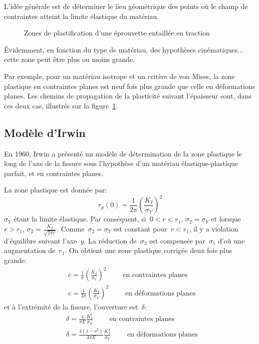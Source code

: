 L'idée générale est de déterminer le lieu géométrique des points où le champ de contraintes atteint la limite élastique du matériau.
\begin{figure}[ht]\centering
{}\hspace{9em}
\caption{Zones de plastification d'une éprouvette entaillée en traction}\label{fig:propagation}
\end{figure}
Évidemment, en fonction du type de matériau, des hypothèses cinématiques... cette zone peut être plus ou moins grande.

\medskip
Par exemple, pour un matériau isotrope et un critère de von Mises, la zone plastique en contraintes planes est neuf fois plus grande que celle en déformations planes.
\medskipvm
Les chemins de propagation de la plasticité suivant l'épaisseur sont, dans ces deux cas, illustrés sur la figure~\ref{fig:propagation}.


\medskip
\subsection{Modèle d'Irwin}
En 1960, Irwin a présenté un modèle de détermination de la zone plastique le long de l'axe de la fissure sous l'hypothèse d'un matériau élastique-plastique parfait, et en contraintes planes.

La zone plastique est donnée par:
\begin{equation}r_p(0)=\frac1{2\pi}\left(\frac{K_I}{\sigma_Y}\right)^2
\end{equation}$\sigma_Y$ étant la limite élastique.
Par conséquent, si~$0<r<r_1$, $\sigma_2=\sigma_Y$ et lorsque~$r>r_1$, $\sigma_2=\frac{K_I}{\sqrt{2\pi r}}$.
Comme~$\sigma_2=\sigma_Y$ est constant pour~$r < r_1$, il y a violation d'équilibre suivant l'axe~$y$. 
La réduction de~$\sigma_2$ est compensée par~$\sigma_1$ d'où une augmentation de~$r_1$.
On obtient une zone plastique corrigée deux fois plus grande:
\begin{align}
&c = \frac1\pi\left(\frac{K_I}{\sigma_Y}\right)^2 \qquad \text{ en contraintes planes }\\
&c = \frac1{3\pi}\left(\frac{K_I}{\sigma_Y}\right)^2 \qquad \text{ en déformations planes }
\end{align}
et à l'extrémité de la fissure, l'ouverture est~$\delta$:
\begin{align}
&\delta = \frac4{\pi E}\frac{K_I^2}{\sigma_Y} \qquad \text{ en contraintes planes }\\
&\delta = \frac{4(1-\nu^2)}{3\pi E}\frac{K_I^2}{\sigma_Y} \qquad \text{ en déformations planes }
\end{align}

